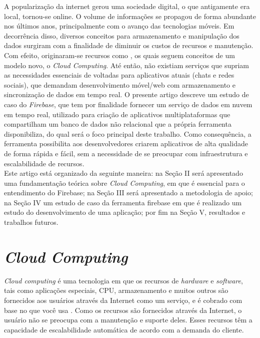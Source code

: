 \documentclass[12pt]{article}
\begin{document}
A popularização da internet gerou uma sociedade digital, o que antigamente era local, tornou-se online. O volume de informações se propagou de forma abundante nos últimos anos, principalmente com o avanço das tecnologias móveis. Em decorrência disso, diversos conceitos para armazenamento e manipulação dos dados surgiram com a finalidade de diminuir os custos de recursos e manutenção. Com efeito, originaram-se recursos como \cite{WA} \cite{GAE} \cite{AWS}, os quais seguem conceitos de um modelo novo, o \textit{Cloud Computing}. Até então, não existiam serviços que supriam as necessidades essenciais de voltadas para aplicativos atuais (chats e redes sociais), que demandam desenvolvimento móvel/web com armazenamento e sincronização de dados em tempo real. O presente artigo descreve um estudo de caso do \textit{Firebase}, que tem por finalidade fornecer um serviço de dados em nuvem em tempo real, utilizado para criação de aplicativos multiplataformas que compartilham um banco de dados não relacional que a própria ferramenta disponibiliza, do qual será o foco principal deste trabalho. Como consequência, a ferramenta possibilita aos desenvolvedores criarem aplicativos de alta qualidade de forma rápida e fácil, sem a necessidade de se preocupar com infraestrutura e escalabilidade de recursos.
\\
Este artigo está organizado da seguinte maneira: na Seção II será apresentado uma fundamentação teórica sobre \textit{Cloud Computing}, em que é essencial para o entendimento do Firebase; na Seção III será apresentado a metodologia de apoio; na Seção IV um estudo de caso da ferramenta firebase em que é realizado um estudo do desenvolvimento de uma aplicação; por fim na Seção V, resultados e trabalhos futuros.

\section{\textit{Cloud Computing}} \label{sec:firstpage}

\textit{Cloud computing} é uma tecnologia em que os recursos de \textit{hardware} e \textit{software}, tais como aplicações especiais, CPU, armazenamento e muitos outros são fornecidos aos usuários através da Internet como um serviço, e é cobrado com base no que você usa \cite{1}. Como os recursos são fornecidos através da Internet, o usuário não se preocupa com a manutenção e suporte deles. Esses recursos têm a capacidade de escalabilidade automática de acordo com a demanda do cliente. 
\end{document}
